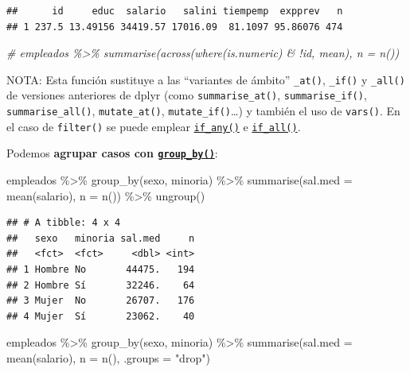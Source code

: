 \documentclass[
]{book}
\newenvironment{Shaded}{\begin{snugshade}}{\end{snugshade}}
\newcommand{\AttributeTok}[1]{\textcolor[rgb]{0.77,0.63,0.00}{#1}}
\newcommand{\CommentTok}[1]{\textcolor[rgb]{0.56,0.35,0.01}{\textit{#1}}}
\newcommand{\FunctionTok}[1]{\textcolor[rgb]{0.00,0.00,0.00}{#1}}
\newcommand{\NormalTok}[1]{#1}
\newcommand{\SpecialCharTok}[1]{\textcolor[rgb]{0.00,0.00,0.00}{#1}}
\newcommand{\StringTok}[1]{\textcolor[rgb]{0.31,0.60,0.02}{#1}}
\theoremstyle{break}
\theoremstyle{nonumberplain}
\begin{document}
\begin{verbatim}
##      id     educ  salario   salini tiempemp  expprev   n
## 1 237.5 13.49156 34419.57 17016.09  81.1097 95.86076 474
\end{verbatim}

\begin{Shaded}
\begin{Highlighting}[]
\CommentTok{\# empleados \%\textgreater{}\% summarise(across(where(is.numeric) \& !id, mean), n = n())}
\end{Highlighting}
\end{Shaded}

NOTA: Esta función sustituye a las ``variantes de ámbito'' \texttt{\_at()}, \texttt{\_if()} y \texttt{\_all()} de versiones anteriores de dplyr (como \texttt{summarise\_at()}, \texttt{summarise\_if()}, \texttt{summarise\_all()}, \texttt{mutate\_at()}, \texttt{mutate\_if()}\ldots) y también el uso de \texttt{vars()}.
En el caso de \texttt{filter()} se puede emplear \href{https://dplyr.tidyverse.org/reference/across.html}{\texttt{if\_any()}} e \href{https://dplyr.tidyverse.org/reference/across.html}{\texttt{if\_all()}}.

Podemos \textbf{agrupar casos con \href{https://dplyr.tidyverse.org/reference/group_by.html}{\texttt{group\_by()}}}:

\begin{Shaded}
\begin{Highlighting}[]
\NormalTok{empleados }\SpecialCharTok{\%\textgreater{}\%} \FunctionTok{group\_by}\NormalTok{(sexo, minoria) }\SpecialCharTok{\%\textgreater{}\%} 
    \FunctionTok{summarise}\NormalTok{(}\AttributeTok{sal.med =} \FunctionTok{mean}\NormalTok{(salario), }\AttributeTok{n =} \FunctionTok{n}\NormalTok{()) }\SpecialCharTok{\%\textgreater{}\%}
    \FunctionTok{ungroup}\NormalTok{()}
\end{Highlighting}
\end{Shaded}

\begin{verbatim}
## # A tibble: 4 x 4
##   sexo   minoria sal.med     n
##   <fct>  <fct>     <dbl> <int>
## 1 Hombre No       44475.   194
## 2 Hombre Sí       32246.    64
## 3 Mujer  No       26707.   176
## 4 Mujer  Sí       23062.    40
\end{verbatim}

\begin{Shaded}
\begin{Highlighting}[]
\NormalTok{empleados }\SpecialCharTok{\%\textgreater{}\%} \FunctionTok{group\_by}\NormalTok{(sexo, minoria) }\SpecialCharTok{\%\textgreater{}\%} 
    \FunctionTok{summarise}\NormalTok{(}\AttributeTok{sal.med =} \FunctionTok{mean}\NormalTok{(salario), }\AttributeTok{n =} \FunctionTok{n}\NormalTok{(), }\AttributeTok{.groups =} \StringTok{"drop"}\NormalTok{)}
\end{Highlighting}
\end{Shaded}
\end{document}
